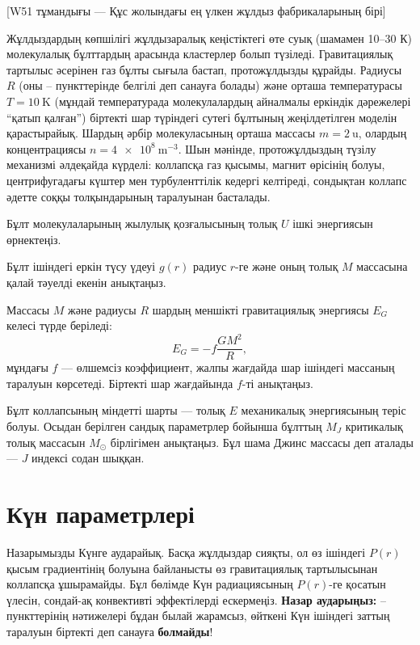 [W51 тұмандығы --- Құс жолындағы ең үлкен жұлдыз фабрикаларының бірі]

Жұлдыздардың көпшілігі жұлдызаралық кеңістіктегі өте суық (шамамен 10–30 К) молекулалық бұлттардың арасында кластерлер болып түзіледі. Гравитациялық тартылыс әсерінен газ бұлты сығыла бастап, протожұлдызды құрайды. Радиусы $R$ (оны – пункттерінде белгілі деп санауға болады) және орташа температурасы $T=\qty{10}{\K}$ (мұндай температурада молекулалардың айналмалы еркіндік дәрежелері ``қатып қалған'') біртекті шар түріндегі сутегі бұлтының жеңілдетілген моделін қарастырайық. Шардың әрбір молекуласының орташа массасы $m=\qty{2}{\amu}$, олардың концентрациясы $n=\qty{4e8}{\m\tothe{-3}}$. Шын мәнінде, протожұлдыздың түзілу механизмі әлдеқайда күрделі: коллапсқа газ қысымы, магнит өрісінің болуы, центрифугадағы күштер мен турбуленттілік кедергі келтіреді, сондықтан коллапс әдетте соққы толқындарының таралуынан басталады.

\begin{task}
\item Бұлт молекулаларының жылулық қозғалысының толық $U$ ішкі энергиясын өрнектеңіз.
\item Бұлт ішіндегі еркін түсу үдеуі $g(r)$ радиус $r$-ге және оның толық $M$ массасына қалай тәуелді екенін анықтаңыз.
\item Массасы $M$ және радиусы $R$ шардың меншікті гравитациялық энергиясы $E_G$ келесі түрде беріледі:
$$
E_G = -f\frac{GM^2}{R},
$$
мұндағы $f$ --- өлшемсіз коэффициент, жалпы жағдайда шар ішіндегі массаның таралуын көрсетеді. Біртекті шар жағдайында $f$-ті анықтаңыз.
\item Бұлт коллапсының міндетті шарты --- толық $E$ механикалық энергиясының теріс болуы. Осыдан берілген сандық параметрлер бойынша бұлттың $M_J$ критикалық толық массасын $M_\odot$ бірлігімен анықтаңыз. Бұл шама Джинс массасы деп аталады --- $J$ индексі содан шыққан.
\end{task}

\part{Күн параметрлері}

Назарымызды Күнге аударайық. Басқа жұлдыздар сияқты, ол өз ішіндегі $P(r)$ қысым градиентінің болуына байланысты өз гравитациялық тартылысынан коллапсқа ұшырамайды. Бұл бөлімде Күн радиациясының $P(r)$-ге қосатын үлесін, сондай-ақ конвективті эффектілерді ескермеңіз. \textbf{Назар аударыңыз:} – пункттерінің нәтижелері бұдан былай жарамсыз, өйткені Күн ішіндегі заттың таралуын біртекті деп санауға \textbf{болмайды}!

